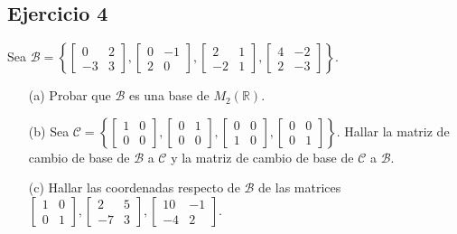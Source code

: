 \documentclass[a4paper,12pt]{article}
\begin{document}
\subsection{Ejercicio 4}
Sea $\mathcal{B} = \left \{ \begin{bmatrix} 0 & 2 \\ -3 & 3 \end{bmatrix}, \begin{bmatrix} 0 & -1 \\ 2 & 0 \end{bmatrix}, \begin{bmatrix} 2 & 1 \\ -2 & 1 \end{bmatrix}, \begin{bmatrix} 4 & -2 \\ 2 & -3 \end{bmatrix} \right \}$.
\begin{itemize}
    \item[(a)] Probar que $\mathcal{B}$ es una base de $M_2(\mathds{R})$.
    \item[(b)] Sea $\mathcal{C} = \left \{ \begin{bmatrix} 1 & 0 \\ 0 & 0 \end{bmatrix}, \begin{bmatrix} 0 & 1 \\ 0 & 0 \end{bmatrix}, \begin{bmatrix} 0 & 0 \\ 1 & 0 \end{bmatrix}, \begin{bmatrix} 0 & 0 \\ 0 & 1 \end{bmatrix} \right \}$. Hallar la matriz de cambio de base de $\mathcal{B}$ a $\mathcal{C}$ y la matriz de cambio de base de $\mathcal{C}$ a $\mathcal{B}$.
    \item[(c)] Hallar las coordenadas respecto de $\mathcal{B}$ de las matrices $\begin{bmatrix} 1 & 0 \\ 0 & 1 \end{bmatrix}, \begin{bmatrix} 2 & 5 \\ -7 & 3 \end{bmatrix}, \begin{bmatrix} 10 & -1 \\ -4 & 2 \end{bmatrix}$. 
\end{itemize}
\end{document}
